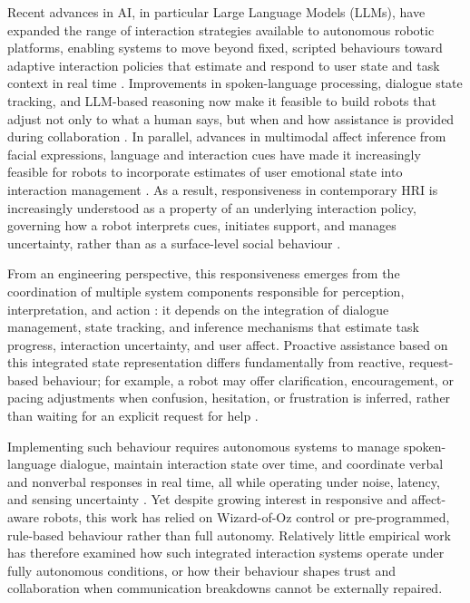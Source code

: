 \documentclass[
  authoryear,
  doubleblind,
  3p]{elsarticle}
\begin{document}
Recent advances in AI, in particular Large Language Models (LLMs), have
expanded the range of interaction strategies available to autonomous
robotic platforms, enabling systems to move beyond fixed, scripted
behaviours toward adaptive interaction policies that estimate and
respond to user state and task context in real time \citep{zhang2023}.
Improvements in spoken-language processing, dialogue state tracking, and
LLM-based reasoning now make it feasible to build robots that adjust not
only to what a human says, but when and how assistance is provided
during collaboration \citep{weia}. In parallel, advances in multimodal
affect inference from facial expressions, language and interaction cues
have made it increasingly feasible for robots to incorporate estimates
of user emotional state into interaction management
\citep{a.v.2024, spitale2023, atone2022}. As a result, responsiveness in
contemporary HRI is increasingly understood as a property of an
underlying interaction policy, governing how a robot interprets cues,
initiates support, and manages uncertainty, rather than as a
surface-level social behaviour
\citep{birnbaum2016, shayganfar2019, zhang2023}.

From an engineering perspective, this responsiveness emerges from the
coordination of multiple system components responsible for perception,
interpretation, and action \citep{diab2025, arkin2003}: it depends on
the integration of dialogue management, state tracking, and inference
mechanisms that estimate task progress, interaction uncertainty, and
user affect. Proactive assistance based on this integrated state
representation differs fundamentally from reactive, request-based
behaviour; for example, a robot may offer clarification, encouragement,
or pacing adjustments when confusion, hesitation, or frustration is
inferred, rather than waiting for an explicit request for help
\citep{birnbaum2016}.

Implementing such behaviour requires autonomous systems to manage
spoken-language dialogue, maintain interaction state over time, and
coordinate verbal and nonverbal responses in real time, all while
operating under noise, latency, and sensing uncertainty
\citep{campagna2025}. Yet despite growing interest in responsive and
affect-aware robots, this work has relied on Wizard-of-Oz control
\citep{birnbaum2016, shayganfar2019} or pre-programmed, rule-based
behaviour \citep{fartook2025} rather than full autonomy. Relatively
little empirical work has therefore examined how such integrated
interaction systems operate under fully autonomous conditions, or how
their behaviour shapes trust and collaboration when communication
breakdowns cannot be externally repaired.
\end{document}
